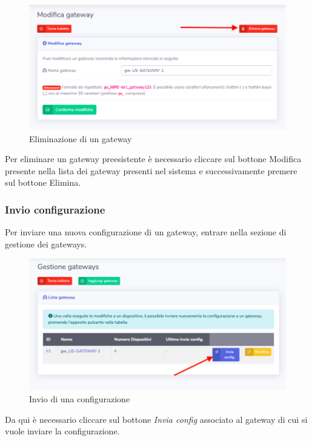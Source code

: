 		\begin{figure}[H]
		\centering
		\includegraphics[scale=0.500]{res/images/admin/elimGateway.png}
		\caption{Eliminazione di un gateway}
	\end{figure}


		Per eliminare un gateway preesistente è necessario cliccare sul bottone Modifica presente nella lista dei gateway presenti nel sistema e successivamente premere sul bottone Elimina.

	\subsubsection{Invio configurazione}

		Per inviare una nuova configurazione di un gateway, entrare nella sezione di gestione dei gateways.

		\begin{figure}[H]
		\centering
		\includegraphics[scale=0.500]{res/images/admin/inviaConfig.png}
		\caption{Invio di una configurazione}
	\end{figure}

		Da qui è necessario cliccare sul bottone \textit{Invia config} associato al gateway di cui si vuole inviare la configurazione.


